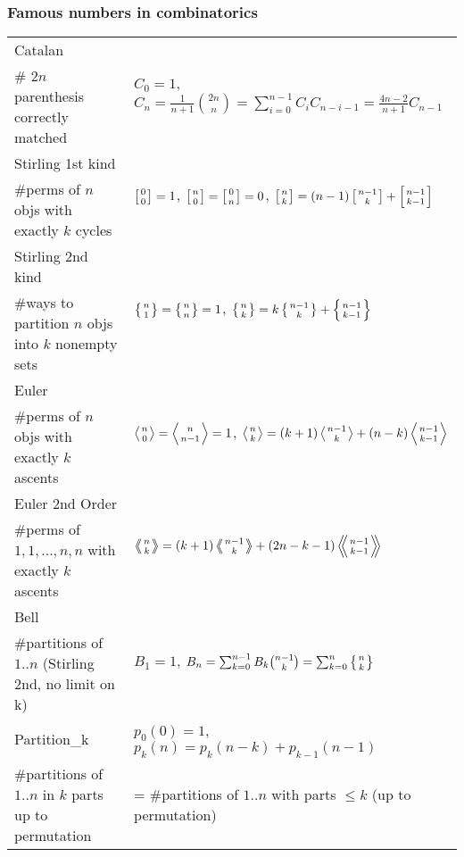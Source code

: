 \documentclass[landscape,a4paper,twocolumn,10pt]{report}
\begin{document}
\subsubsection*{Famous numbers in combinatorics}

\begin{center}
\begin{tabular}{@{}l|l@{}}
Catalan & \multirow{2}{*}{$C_0=1$, $C_n=\frac{1}{n+1}\binom{2n}{n} = \sum_{i=0}^{n-1}C_iC_{n-i-1} = \frac{4n-2}{n+1}C_{n-1}$} \\
\# $2n$ parenthesis correctly matched & \\
Stirling 1st kind & \multirow{2}{*}{$\left[{0\atop 0}\right]=1$, $\left[{n\atop 0}\right]=\left[{0\atop n}\right]=0$, $\left[{n\atop k}\right]=(n-1)\left[{n-1\atop k}\right]+\left[{n-1\atop k-1}\right]$} \\
\#perms of $n$ objs with exactly $k$ cycles & \\ %
Stirling 2nd kind & \multirow{2}{*}{$\left\{{n\atop 1}\right\}=\left\{{n\atop n}\right\}=1$, $\left\{{n\atop k}\right\} = k \left\{{ n-1 \atop k }\right\} + \left\{{n-1\atop k-1}\right\}$} \\
\#ways to partition $n$ objs into $k$ nonempty sets & \\ %
Euler & \multirow{2}{*}{$\left \langle {n\atop 0} \right \rangle = \left \langle {n\atop n-1} \right \rangle = 1 $, $\left \langle {n\atop k} \right \rangle = (k+1) \left \langle {n-1\atop {k}} \right \rangle + (n-k)\left \langle {{n-1}\atop {k-1}} \right \rangle$} \\
\#perms of $n$ objs with exactly $k$ ascents & \\ %
Euler 2nd Order & \multirow{2}{*}{$\left \langle \!\!\left \langle {n\atop k} \right \rangle \!\! \right \rangle = (k+1) \left \langle \!\! \left \langle {{n-1}\atop {k}} \right \rangle \!\! \right \rangle +(2n-k-1)\left \langle \!\! \left \langle {{n-1}\atop {k-1}} \right \rangle \!\! \right \rangle$} \\
\#perms of ${1,1,...,n,n}$ with exactly $k$ ascents & \\ %
Bell & \multirow{2}{*}{$B_1 = 1$, $B_n = \sum_{k=0}^{n-1} B_k \binom{n-1}{k} = \sum_{k=0}^n\left\{{n\atop k}\right\}$} \\
\#partitions of $1..n$ (Stirling 2nd, no limit on k) & \\
Partition\_k & $p_0(0) = 1$, $p_k(n) = p_k(n-k) + p_{k-1}(n-1)$ \\
\#partitions of $1..n$ in $k$ parts up to permutation & = \#partitions of $1..n$ with parts $\leq k$ (up to permutation)\\
\end{tabular}
\end{center}
\end{document}

